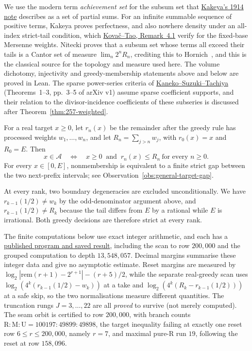 \begin{rem}
We use the modern term \emph{achievement set} for the subsum set that
\href{https://doi.org/10.11429/ptmps1907.7.14_250}{Kakeya's 1914 note} describes
as a set of partial sums.  For an infinite summable sequence of positive
terms, Kakeya proves perfectness, and also nowhere density under an
all-index strict-tail condition, which
\href{https://arxiv.org/abs/2406.17593v4}{Kova\v{c}--Tao,
Remark~4.1} verify for the fixed-base Mersenne weights. Nitecki proves
that a subsum set whose terms all exceed their tails is a Cantor set of
measure $\lim_n2^nR_n$, crediting this to
Hornich~\cite[Theorem~4(1), p.~9]{nitecki2013}, and this is the classical
source for the topology and measure used here. The volume dichotomy,
injectivity and greedy-membership statements above and below are proved
in Lean.  The sparse power-series criteria
of \href{https://arxiv.org/abs/2601.20743}{Kaneko--Suzuki--Tachiya}
(Theorems~1--3, pp.~3--5 of arXiv v1) assume sparse coefficient supports,
and their relation to the divisor-incidence coefficients of these
subseries is discussed after Theorem~\ref{thm:257-weighted}.
\end{rem}

\begin{thm}
\label{thm:greedy-survival}
For a real target $x\ge0$, let $r_n(x)$ be the remainder after the
greedy rule has processed weights $w_1,\ldots,w_n$, and let
$R_n=\sum_{j>n}w_j$, with $r_0(x)=x$ and $R_0=E$.  Then
\[
 x\in\mathcal A\quad\Longleftrightarrow\quad
 x\ge0\ \text{ and }\ r_n(x)\le R_n\ \text{for every }n\ge0.
\]
For every $x\in[0,E]$, nonmembership is equivalent to a finite
strict gap between the two next-prefix intervals; see
Observation~\ref{obs:general-target-gap}.
\end{thm}

At every rank, two boundary degeneracies are excluded unconditionally. We have
$r_{k-1}(1/2)\ne w_k$ by the odd-denominator argument above, and $r_{k-1}(1/2)\ne R_k$
because the tail differs from $E$ by a rational while $E$ is irrational. Both greedy decisions are therefore strict at every rank.

The finite computations below use exact integer arithmetic, and each has a
\href{https://github.com/wcook04/plectis-erdos/tree/f757115e03bebe5c04431a147da559015c680a37/research/experiments/erdos257}{published program and saved result},
including the scan to row $200{,}000$ and the grouped computation to
depth $13{,}548{,}057$. Decimal margins summarise these integer data and
give no asymptotic estimate. Reset margins are measured by
$\log_2|\mathrm{rem}(r+1)-2^{r+1}|-(r+5)/2$, while the separate
real-greedy scan uses $\log_2(4^k(r_{k-1}(1/2)-w_k))$ at a take and
$\log_2(4^k(R_k-r_{k-1}(1/2)))$ at a safe skip, so the two normalisations
measure different quantities. The truncation rungs $J = 3,\dots,22$ are all
\emph{proved} to survive (not merely computed). The seam orbit is
certified to row $200{,}000$, with branch counts
$\mathrm{R{:}M{:}U} = 100197{:}49899{:}49898$, the target inequality
failing at exactly one reset row $6\le r\le200{,}000$, namely $r = 7$, and
maximal pure-R run $19$, following the reset at row $158{,}096$.

